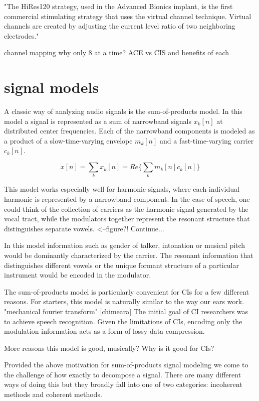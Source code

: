 \documentclass [11pt, proquest] {uwthesis}[2015/03/03]
\begin{document}
"The HiRes120 strategy, used in the Advanced Bionics implant, is the first commercial stimulating strategy that uses the virtual channel technique. Virtual channels are created by adjusting the current level ratio of two neighboring electrodes."

channel mapping
	why only 8 at a time?
	ACE vs CIS and benefits of each

\section{signal models}

A classic way of analyzing audio signals is the sum-of-products model.  In this model a signal is represented as a sum of narrowband signals $x_k[n]$ at distributed center frequencies.  Each of the narrowband components is modeled as a product of a slow-time-varying envelope $m_k[n]$ and a fast-time-varying carrier $c_k[n]$.

$$x[n] = \sum\limits_k x_k[n] = Re\bigg\{ \sum\limits_k m_k[n] c_k[n] \bigg\}$$

This model works especially well for harmonic signals, where each individual harmonic is represented by a narrowband component.  In the case of speech, one could think of the collection of carriers as the harmonic signal generated by the vocal tract, while the modulators together represent the resonant structure that distinguishes separate vowels. <--figure?!  Continue...

In this model information such as gender of talker, intonation or musical pitch would be dominantly characterized by the carrier.  The resonant information that distinguishes different vowels or the unique formant structure of a particular instrument would be encoded in the modulator.

The sum-of-products model is particularly convenient for CIs for a few different reasons. For starters, this model is naturally similar to the way our ears work. "mechanical fourier transform" [chimeara] The initial goal of CI researchers was to achieve speech recognition.  Given the limitations of CIs, encoding only the modulation information acts as a form of lossy data compression.

More reasons this model is good, musically?
Why is it good for CIs?

Provided the above motivation for sum-of-products signal modeling we come to the challenge of how exactly to decompose a signal.  There are many different ways of doing this but they broadly fall into one of two categories: incoherent methods and coherent methods.
\end{document}
